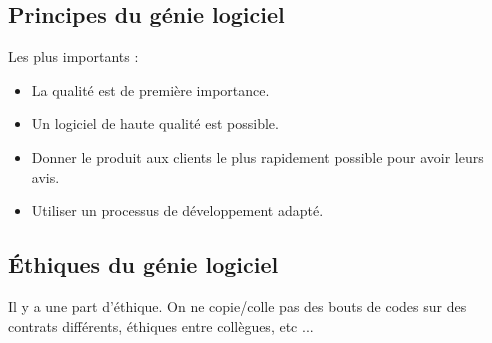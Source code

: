 \subsection{Principes du génie logiciel}
Les plus importants :
\begin{itemize}
   \item La qualité est de première importance.
   \item Un logiciel de haute qualité est possible.
   \item Donner le produit aux clients le plus rapidement possible pour avoir leurs avis.
   \item Utiliser un processus de développement adapté.
\end{itemize}



\subsection{Éthiques du génie logiciel}
Il y a une part d'éthique. On ne copie/colle pas des bouts de codes sur des contrats différents, éthiques entre collègues, etc ...
